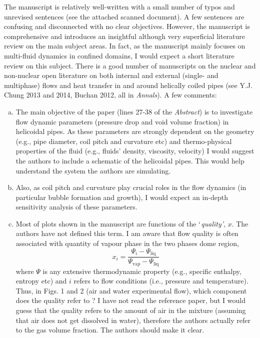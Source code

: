 \documentclass[14pt,twoside]{report}
\begin{document}
{{{The manuscript is relatively well-written with a small number of typos and unrevised sentences (see the attached scanned document). A few sentences are confusing and disconnected with no clear objectives. However, the manuscript is comprehensive and introduces an insightful although very superficial literature review on the main subject areas. In fact, as the manuscript mainly focuses on multi-fluid dynamics in confined domains, I would expect a short literature review on this subject. There is a good number of manuscripts on the nuclear and non-nuclear open literature on both internal and external (single- and multiphase) flows and heat transfer in and around helically coiled pipes (see Y.J. Chung 2013 and 2014, Buchan 2012, all in {\it Annals}). A few comments:
\begin{enumerate}[(a)]
%
\item  The main objective of the paper (lines 27-38 of the {\it Abstract}) is to investigate flow dynamic parameters (pressure drop and void volume fraction) in helicoidal pipes. As these parameters are strongly dependent on the geometry (e.g., pipe diameter, coil pitch and curvature etc) and thermo-physical properties of the fluid (e.g., fluids' density, viscosity, velocity) I would suggest the authors to include a schematic of the helicoidal pipes. This would help understand the system the authors are simulating.
%
\item Also, as coil pitch and curvature play  crucial roles in the flow dynamics (in particular bubble formation and growth), I would expect an in-depth sensitivity analysis of these parameters.
%
\item Most of plots shown in the manuscript are functions of the {\it $\lq$quality'}, $x$. The authors have not defined this term. I am aware that flow quality is often associated with quantity of vapour phase in the two phases dome region, 
\begin{displaymath}
x_{i} = \frac{\Psi_{i} - \Psi_{\text{liq}}}{\Psi_{\text{vap}}-\Psi_{\text{liq}}}
\end{displaymath}
where $\Psi$ is any extensive thermodynamic property (e.g., specific enthalpy, entropy etc) and $i$ refers to flow conditions (i.e., pressure and temperature). Thus, in Figs. 1 and 2 (air and water experimental flow), which component does the quality refer to ? I have not read the reference paper, but I would guess that the quality refers to the amount of air in the mixture (assuming that air does not get dissolved in water), therefore the authors actually refer to the gas volume fraction. The authors should make it clear.

\end{enumerate}}}}
\end{document}
